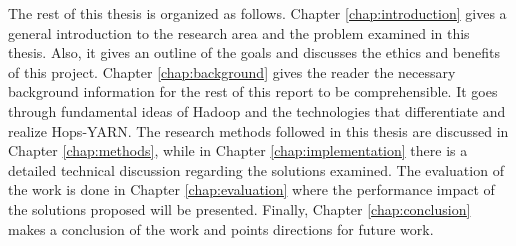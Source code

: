 The rest of this thesis is organized as follows. Chapter 
\ref{chap:introduction} gives a general introduction to the
research area and the problem examined in this thesis. Also, it gives
an outline of the goals and discusses the ethics and benefits of this
project. Chapter \ref{chap:background} gives the reader the necessary
background information for the rest of this report to be
comprehensible. It goes through fundamental ideas of Hadoop and the
technologies that differentiate and realize Hops-YARN. The research methods followed in
this thesis are discussed in Chapter \ref{chap:methods}, while in Chapter
\ref{chap:implementation} there is a detailed technical discussion
regarding the solutions examined. The evaluation of the work is done
in Chapter \ref{chap:evaluation} where the performance impact of the
solutions proposed will be presented. Finally, Chapter
\ref{chap:conclusion} makes a conclusion of the work and points
directions for future work.
